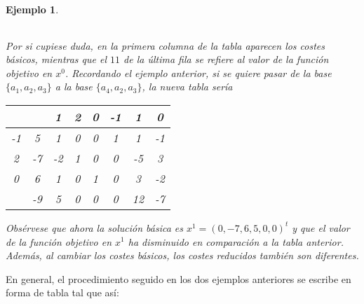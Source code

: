 \documentclass[11pt]{report}
\theoremstyle{mytheorem}
\theoremstyle{mydefinition}
\theoremstyle{myexample}
\newtheorem*{example}{Ejemplo}
\begin{document}
\begin{example}
\begin{center}
\begin{tabular}{|c|c|c|c|c|c|c|c|}
    \cline{2-8}
\end{tabular}
\end{center}
Por si cupiese duda, en la primera columna de la tabla aparecen los costes básicos, mientras que el $11$ de la última fila se refiere al valor de la función objetivo en $x^0$. Recordando el ejemplo anterior, si se quiere pasar de la base $\{a_1,a_2,a_3\}$ a la base $\{a_4,a_2,a_3\}$, la nueva tabla sería
\begin{center}
\begin{tabular}{|c|c|c|c|c|c|c|c|}
    \cline{3-8}
    \multicolumn{1}{c}{} & \multicolumn{1}{c|}{} & \multicolumn{1}{c}{\phantom{-}1} & \multicolumn{1}{c}{2} & \multicolumn{1}{c}{0} & \multicolumn{1}{c}{-1} & \multicolumn{1}{c}{\phantom{-}1} & \multicolumn{1}{c|}{\phantom{-}0} \\ \hline
    
    -1 & \phantom{-}5 & \multicolumn{1}{c}{\phantom{-}1} & \multicolumn{1}{c}{0} & \multicolumn{1}{c}{0} & \multicolumn{1}{c}{\phantom{-}1} & \multicolumn{1}{c}{\phantom{-}1} & \multicolumn{1}{c|}{-1} \\
    
    \phantom{-}2 & -7 & \multicolumn{1}{c}{-2} & \multicolumn{1}{c}{1} & \multicolumn{1}{c}{0} & \multicolumn{1}{c}{\phantom{-}0} & \multicolumn{1}{c}{-5} & \multicolumn{1}{c|}{\phantom{-}3} \\
    
    \phantom{-}0 & \phantom{-}6 & \multicolumn{1}{c}{\phantom{-}1} & \multicolumn{1}{c}{0} & \multicolumn{1}{c}{1} & \multicolumn{1}{c}{\phantom{-}0} & \multicolumn{1}{c}{\phantom{-}3} & \multicolumn{1}{c|}{-2} \\ \hline
    
    \multicolumn{1}{c|}{} & -9 & \multicolumn{1}{c}{\phantom{-}5} & \multicolumn{1}{c}{0} & \multicolumn{1}{c}{0} & \multicolumn{1}{c}{\phantom{-}0} & \multicolumn{1}{c}{\phantom{-}12} & \multicolumn{1}{c|}{-7} \\
    \cline{2-8}
\end{tabular}
\end{center}
Obsérvese que ahora la solución básica es $x^1=(0,-7,6,5,0,0)^t$ y que el valor de la función objetivo en $x^1$ ha disminuido en comparación a la tabla anterior. Además, al cambiar los costes básicos, los costes reducidos también son diferentes.
\end{example}

En general, el procedimiento seguido en los dos ejemplos anteriores se escribe en forma de tabla tal que así:
\end{document}
